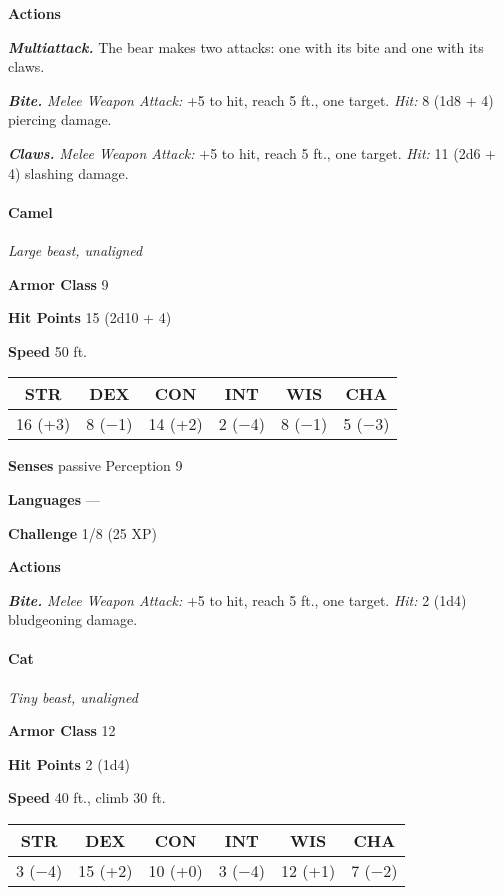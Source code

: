 \documentclass[
]{article}
\begin{document}
\textbf{Actions}

\emph{\textbf{Multiattack.}} The bear makes two attacks: one with its
bite and one with its claws.

\emph{\textbf{Bite.}} \emph{Melee Weapon Attack:} +5 to hit, reach 5
ft., one target. \emph{Hit:} 8 (1d8 + 4) piercing damage.

\emph{\textbf{Claws.}} \emph{Melee Weapon Attack:} +5 to hit, reach 5
ft., one target. \emph{Hit:} 11 (2d6 + 4) slashing damage.

\hypertarget{camel}{%
\paragraph{Camel}\label{camel}}

\emph{Large beast, unaligned}

\textbf{Armor Class} 9

\textbf{Hit Points} 15 (2d10 + 4)

\textbf{Speed} 50 ft.

\begin{longtable}[]{@{}cccccc@{}}
\toprule
STR & DEX & CON & INT & WIS & CHA\tabularnewline
\midrule
\endhead
16 (+3) & 8 (−1) & 14 (+2) & 2 (−4) & 8 (−1) & 5 (−3)\tabularnewline
\bottomrule
\end{longtable}

\textbf{Senses} passive Perception 9

\textbf{Languages} ---

\textbf{Challenge} 1/8 (25 XP)

\textbf{Actions}

\emph{\textbf{Bite.}} \emph{Melee Weapon Attack:} +5 to hit, reach 5
ft., one target. \emph{Hit:} 2 (1d4) bludgeoning damage.

\hypertarget{cat}{%
\paragraph{Cat}\label{cat}}

\emph{Tiny beast, unaligned}

\textbf{Armor Class} 12

\textbf{Hit Points} 2 (1d4)

\textbf{Speed} 40 ft., climb 30 ft.

\begin{longtable}[]{@{}cccccc@{}}
\toprule
STR & DEX & CON & INT & WIS & CHA\tabularnewline
\midrule
\endhead
3 (−4) & 15 (+2) & 10 (+0) & 3 (−4) & 12 (+1) & 7 (−2)\tabularnewline
\bottomrule
\end{longtable}
\end{document}
